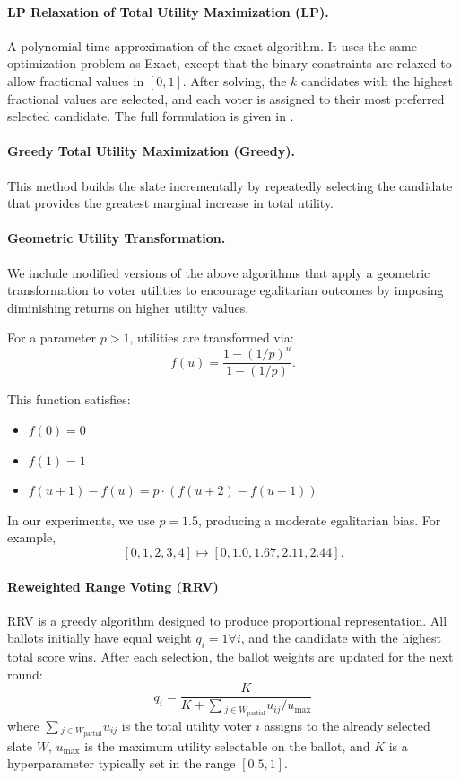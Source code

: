 \documentclass[11pt]{article}
\begin{document}
\paragraph{LP Relaxation of Total Utility Maximization (LP).}
A polynomial-time approximation of the exact algorithm. It uses the same optimization problem as Exact, except that the binary constraints are relaxed to allow fractional values in $[0,1]$. After solving, the $k$ candidates with the highest fractional values are selected, and each voter is assigned to their most preferred selected candidate. The full formulation is given in .


\paragraph{Greedy Total Utility Maximization (Greedy).}
This method builds the slate incrementally by repeatedly selecting the candidate that provides the greatest marginal increase in total utility.

\paragraph{Geometric Utility Transformation.}
We include modified versions of the above algorithms that apply a geometric transformation to voter utilities to encourage egalitarian outcomes by imposing diminishing returns on higher utility values.

For a parameter $p > 1$, utilities are transformed via:
\[
f(u) = \frac{1 - (1/p)^u}{1 - (1/p)}.
\]

This function satisfies:
\begin{itemize}
    \item $f(0) = 0$
    \item $f(1) = 1$
    \item $f(u+1) - f(u) = p \cdot (f(u+2) - f(u+1))$
\end{itemize}

In our experiments, we use $p = 1.5$, producing a moderate egalitarian bias. For example,
\[
[0, 1, 2, 3, 4] \mapsto [0, 1.0, 1.67, 2.11, 2.44].
\]

\paragraph{Reweighted Range Voting (RRV) \citep{rangevoting-rrv}}
RRV is a greedy algorithm designed to produce proportional representation. All ballots initially have equal weight $q_i=1 \forall i$, and the candidate with the highest total score wins. After each selection, the ballot weights are updated for the next round:
$$
q_i = \frac{K}{K + \sum{_{j \in W_{\mathrm{partial}}}u_{ij}}/u_{\mathrm{max}}}
$$
where $\sum{_{j \in W_{\mathrm{partial}}}u_{ij}}$ is the total utility voter $i$ assigns to the already selected slate $W$, $u_{\mathrm{max}}$ is the maximum utility selectable on the ballot, and $K$ is a hyperparameter typically set in the range $[0.5, 1]$.
\end{document}
